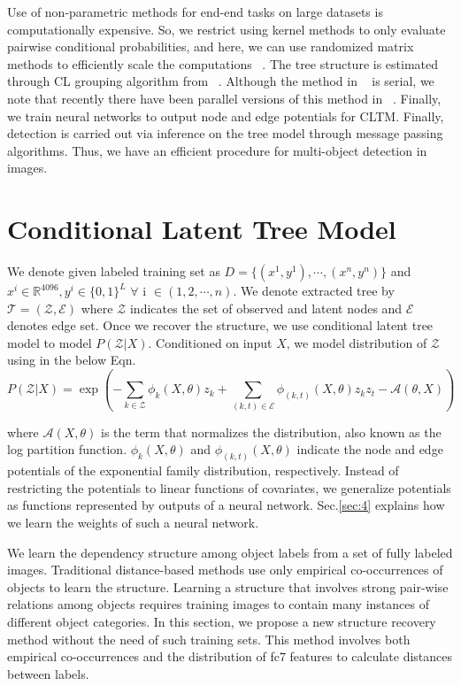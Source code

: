 \documentclass{article}
\begin{document}
Use of non-parametric methods for end-end tasks on large datasets is computationally expensive. So, we restrict using kernel methods to only evaluate  pairwise conditional probabilities, and here, we can use randomized matrix methods to efficiently scale the computations ~\cite{nystorm}. The tree structure is estimated through CL grouping algorithm from ~\cite{LTM}. Although the method in ~\cite{LTM} is serial, we note that recently there have been parallel versions of this method in ~\cite{scalableLTM}.  Finally, we train neural networks to output node and edge potentials for CLTM. Finally, detection is carried out via inference on the tree model through message passing algorithms. Thus, we have an efficient procedure for multi-object detection in images.


\section{Conditional Latent Tree Model} \label{sec:3}

We denote given labeled training set as $D =\{(x^{1},y^{1}),\cdots,(x^{n},y^{n})\}$  and  $ x^{i} \in  \mathbb{R}^{4096} , y^{i} \in  \{0,1\}^L$ $\forall$  i  $\in  (1,2,\cdots,n)$. We denote extracted tree by $ \mathcal{T} = (\mathcal{Z}, \mathcal{E})$ where $\mathcal{Z}$ indicates the set of observed and latent nodes and $\mathcal{E}$ denotes edge set.  Once we recover the structure, we use conditional latent tree model to model $P( \mathcal{Z}|X)$. Conditioned on input $X$, we model distribution of $\mathcal{Z}$  using in the below Eqn.
\begin{equation*}
P(\mathcal{Z} | X)  = \exp\left(-\sum_{k \in \mathcal{Z}}\phi_{k}(X, \theta)z_{k}+    \sum_{(k,t) \in \mathcal{E}}\phi_{(k,t)}(X,\theta)z_{k}z_{t}  - \mathcal{A}(\theta,X)\right)
\end{equation*}

where $\mathcal{A}(X, \theta)$ is the term that normalizes the distribution, also known as the log partition function. $\phi_{k}(X, \theta)$ and  $\phi_{(k,t)}(X, \theta)$
indicate the node and edge potentials of the exponential family distribution, respectively. Instead of restricting the potentials to linear functions of covariates, we generalize potentials as functions represented by outputs of a neural network. Sec.\ref{sec:4} explains how we learn the weights of such a neural network.



We learn the dependency structure among object labels from a set of fully labeled images. Traditional distance-based methods use only empirical co-occurrences of objects to learn the structure. Learning a structure that involves strong pair-wise relations among objects requires  training images to contain many instances of different object categories.
In this section, we propose a new structure recovery method without the need of such training sets. This method involves both empirical co-occurrences and the distribution of fc7 features to calculate distances between labels.
\end{document}
